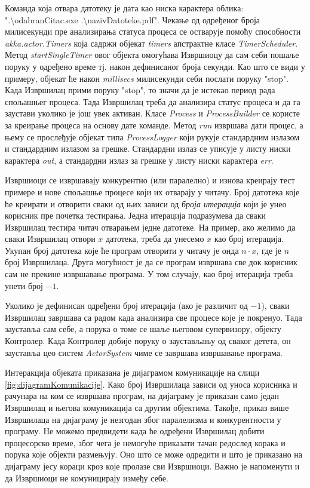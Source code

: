 \documentclass[12pt,oneside]{memoir}
\begin{document}
Команда која отвара датотеку је дата као ниска карактера облика: ".\textbackslash odabranCitac.exe .\textbackslash nazivDatoteke.pdf". Чекање од одређеног броја милисекунди пре анализирања статуса процеса се остварује помоћу способности \textit{akka.actor.Timers} која садржи објекат \textit{timers} апстрактне класе \textit{TimerScheduler}. Метод \textit{startSingleTimer} овог објекта омогућава Извршиоцу да сам себи пошаље поруку у одређено време тј. након дефинисаног броја секунди. Као што се види у примеру, објекат ће након \textit{millisecs} милисекунди себи послати поруку "stop". Када Извршилац прими поруку "stop", то значи да је истекао период рада спољашњег процеса. Тада Извршилац треба да анализира  статус процеса и да га заустави уколико је још увек активан. Класе \textit{Process} и \textit{ProcessBuilder} се користе за креирање процеса на основу дате команде. Метод \textit{run} извршава дати процес, а њему се прослеђује објекат типа \textit{ProcessLogger} који рукује стандардним излазом и стандардним излазом за грешке. Стандардни излаз се уписује у листу ниски карактера \textit{out}, а стандардни излаз за грешке у листу ниски карактера \textit{err}.

Извршиоци се извршавају конкурентно (или паралелно) и изнова креирају тест примере и нове спољашње процесе који их отварају у читачу. Број датотека које ће креирати и отворити сваки од њих зависи од \textit{броја итерација} који је унео корисник пре почетка тестирања. Једна итерација подразумева да сваки Извршилац тестира читач отварањем једне датотеке. На пример, ако желимо да сваки Извршилац отвори $x$ датотека, треба да унесемо $x$ као број итерација. Укупан број датотека које ће програм отворити у читачу је онда $n \cdot x$, где је $n$ број Извршилаца. Друга могућност је да се програм извршава све док корисник сам не прекине извршавање програма. У том случају, као број итерација треба унети број $-1$.

Уколико је дефинисан одређени број итерација (ако је различит од $-1$), сваки Извршилац завршава са радом када анализира све процесе које је покренуо. Тада зауставља сам себе, а порука о томе се шаље његовом супервизору, објекту Контролер. Када Контролер добије поруку о заустављању од сваког детета, он зауставља цео систем \textit{ActorSystem} чиме се завршава извршавање програма.

Интеракција објеката приказана је дијаграмом комуникације на слици \ref{fig:dijagramKomunikacije}. Како број Извршилаца зависи од уноса корисника и рачунара на ком се извршава програм, на дијаграму је приказан само један Извршилац и његова комуникација са другим објектима. Такође, приказ више Извршилаца на дијаграму је незгодан због паралелизма и конкурентности у програму. Не можемо предвидети када ће одређени Извршилац добити процесорско време, због чега је немогуће приказати тачан редослед корака и порука које објекти размењују. Оно што се може одредити и што је приказано на дијаграму јесу кораци кроз које пролазе сви Извршиоци. Важно је напоменути и да Извршиоци не комуницирају између себе.  
\end{document}

